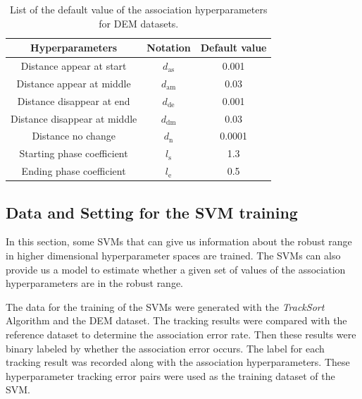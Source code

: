 \begin{table}[htbp] 
    \centering
    \caption{List of the default value of the association hyperparameters for DEM datasets.} 
    \begin{tabular}{ccc} 
    \toprule 
    Hyperparameters&Notation& Default value\\ 
    \midrule 
    Distance appear at start        &$d_{\mathrm{as}}$&0.001\\
    Distance appear at middle       &$d_{\mathrm{am}}$&0.03\\
    Distance disappear at end       &$d_{\mathrm{de}}$&0.001\\
    Distance disappear at middle    &$d_{\mathrm{dm}}$&0.03\\
    Distance no change              &$d_{\mathrm{n}}$&0.0001\\
    Starting phase coefficient      &$l_{\mathrm{s}}$&1.3\\
    Ending phase coefficient        &$l_{\mathrm{e}}$&0.5\\
    \bottomrule 
    \end{tabular} 
    \label{defaultasso2}
\end{table}


\subsection{Data and Setting for the SVM training}
\label{training data svm}

In this section, some SVMs that can give us information about the robust range in higher dimensional hyperparameter spaces are trained. The SVMs can also provide us a model to estimate whether a given set of values of the association hyperparameters are in the robust range. 

The data for the training of the SVMs were generated with the \textit{TrackSort} Algorithm and the DEM dataset. The tracking results were compared with the reference dataset to determine the association error rate. Then these results were binary labeled by whether the association error occurs. The label for each tracking result was recorded along with the association hyperparameters. These hyperparameter tracking error pairs were used as the training dataset of the SVM. 

